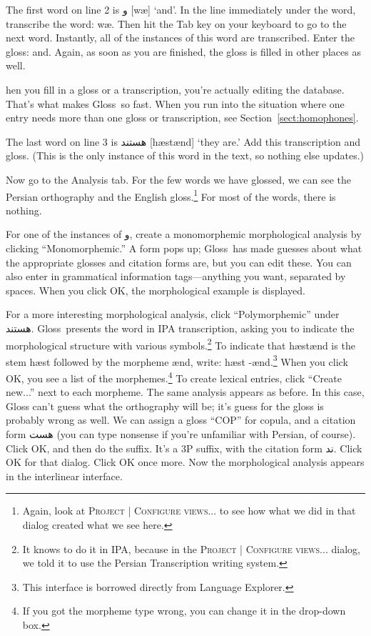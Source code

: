 \documentclass[oneside]{book}
\def\menu#1{\textsc{#1}}
\def\menu#1#2{\textsc{#1 | #2}}
\def\gloss{\textsf{Gloss}}
\def\p#1{\textfarsi{#1}}
\def\tip#1\par{\medskip\noindent\fcolorbox{black}{light-gray}{\parbox{\textwidth}{#1}}\par\medskip}
\begin{document}
The first word on line 2 is \p{و} [wæ] `and'. In the line immediately under the word, transcribe the word: wæ. Then hit the Tab key on your keyboard to go to the next word. Instantly, all of the instances of this word are transcribed. Enter the gloss: and. Again, as soon as you are finished, the gloss is filled in other places as well.

\tip When you fill in a gloss or a transcription, you're actually editing the database. That's what makes \gloss\ so fast. When you run into the situation where one entry needs more than one gloss or transcription, see Section~\ref{sect:homophones}.

The last word on line 3 is \p{هستند} [hæstænd] `they are.' Add this transcription and gloss. (This is the only instance of this word in the text, so nothing else updates.)

Now go to the Analysis tab. For the few words we have glossed, we can see the Persian orthography and the English gloss.\footnote{Again, look at \menu{Project}{Configure views...} to see how what we did in that dialog created what we see here.} For most of the words, there is nothing.

For one of the instances of  \p{و}, create a monomorphemic morphological analysis by clicking ``Monomorphemic.'' A form pops up; \gloss\ has made guesses about what the appropriate glosses and citation forms are, but you can edit these. You can also enter in grammatical information tags---anything you want, separated by spaces. When  you click OK, the morphological example is displayed.

For a more interesting morphological analysis, click ``Polymorphemic'' under \p{هستند}. \gloss\ presents the word in IPA transcription, asking you to indicate the morphological structure with various symbols.\footnote{It knows to do it in IPA, because in the \menu{Project}{Configure views...} dialog, we told it to use the Persian Transcription writing system.} To indicate that hæstænd is the stem hæst followed by the morpheme ænd, write: hæst -ænd.\footnote{This interface is borrowed directly from Language Explorer.} When you click OK, you see a list of the morphemes.\footnote{If you got the morpheme type wrong, you can change it in the drop-down box.} To create lexical entries, click ``Create new...'' next to each morpheme. The same analysis appears as before. In this case, Gloss can't guess what the orthography will be; it's guess for the gloss is probably wrong as well. We can assign a gloss ``COP'' for copula, and a citation form \p{هست} (you can type nonsense if you're unfamiliar with Persian, of course). Click OK, and then do the suffix. It's a 3P suffix, with the citation form \p{ند}. Click OK for that dialog. Click OK once more. Now the morphological analysis appears in the interlinear interface.
\end{document}
